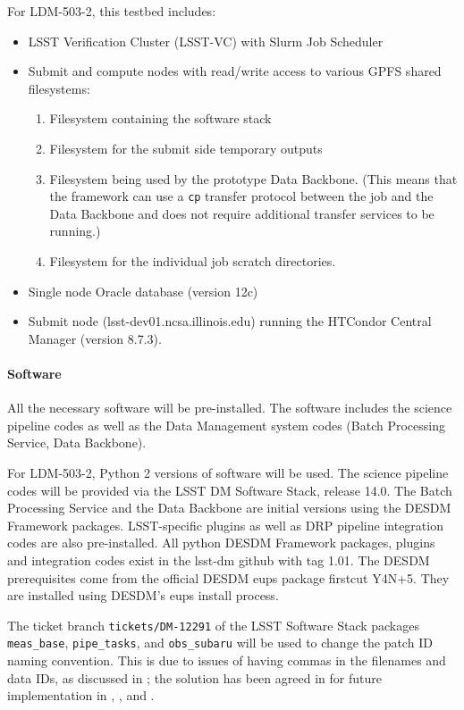 For LDM-503-2, this testbed includes:
\begin{itemize}
\item{LSST Verification Cluster (LSST-VC) with Slurm Job Scheduler}
\item{Submit and compute nodes with read/write access to various GPFS shared filesystems:}
\begin{enumerate}
\item{Filesystem containing the software stack}
\item{Filesystem for the submit side temporary outputs}
\item{Filesystem being used by the prototype Data Backbone. (This means that the framework can use a \texttt{cp} transfer protocol between the job and the Data Backbone and does not require additional transfer services to be running.)}
\item{Filesystem for the individual job scratch directories.}
\end{enumerate}
\item{Single node Oracle database (version 12c)}
\item{Submit node (lsst-dev01.ncsa.illinois.edu) running the HTCondor Central Manager (version 8.7.3).}
\end{itemize}

\paragraph{Software}\label{sec:software}
All the necessary software will be pre-installed. The software
includes the science pipeline codes as well as the Data Management
system codes (Batch Processing Service, Data Backbone).

For LDM-503-2, Python 2 versions of software will be used. The
science pipeline codes will be provided via the LSST DM Software
Stack, release 14.0.  The Batch Processing Service and the Data Backbone
are initial versions using the DESDM Framework packages.  LSST-specific
plugins as well as DRP pipeline integration codes are also pre-installed.
All python DESDM Framework packages, plugins and integration codes exist
in the lsst-dm github with tag 1.01. The DESDM prerequisites come from
the official DESDM eups package firstcut Y4N+5.   They are installed
using DESDM's eups install process.

The ticket branch \texttt{tickets/DM-12291} of the LSST Software Stack
packages \texttt{meas{\_}base}, \texttt{pipe{\_}tasks}, and
\texttt{obs{\_}subaru} will be used to change the patch ID naming
convention.  This is due to issues of having commas in the filenames
and data IDs, as discussed in ; the solution has been
agreed in  for future implementation in ,
, and .

